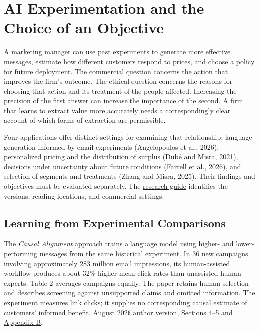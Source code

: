 \hypertarget{M09-ai-experimentation-and-the-choice-of-an-objective}{%
\section{AI Experimentation and the Choice of an
Objective}\label{M09-ai-experimentation-and-the-choice-of-an-objective}}

\noindent A marketing manager can use past experiments to generate more effective
messages, estimate how different customers respond to prices, and choose
a policy for future deployment. The commercial question concerns the
action that improves the firm's outcome. The ethical question concerns
the reasons for choosing that action and its treatment of the people
affected. Increasing the precision of the first answer can increase the
importance of the second. A firm that learns to extract value more
accurately needs a correspondingly clear account of which forms of
extraction are permissible.

Four applications offer distinct settings for examining that
relationship: language generation informed by email experiments
(Angelopoulos et al., 2026), personalized pricing and the distribution
of surplus (Dubé and Misra, 2021), decisions under uncertainty about
future conditions (Farrell et al., 2026), and selection of segments and
treatments (Zhang and Misra, 2025). Their findings and objectives must
be evaluated separately. The
\href{../01_Resources/16_AI_Experimentation_and_Pricing/01_Research/README.md}{research
guide} identifies the versions, reading locations, and commercial
settings.

\hypertarget{M09-learning-from-experimental-comparisons}{%
\subsection{Learning from Experimental
Comparisons}\label{M09-learning-from-experimental-comparisons}}

\noindent The \emph{Causal Alignment} approach trains a language model using
higher- and lower-performing messages from the same historical
experiment. In 36 new campaigns involving approximately 283 million
email impressions, its human-assisted workflow produces about 32\%
higher mean click rates than unassisted human experts. Table 2 averages
campaigns equally. The paper retains human selection and describes
screening against unsupported claims and omitted information. The
experiment measures link clicks; it supplies no corresponding causal
estimate of customers' informed benefit.
\href{https://leekevin.io/caLM.pdf}{August 2026 author version, Sections
4--5 and Appendix B}.

